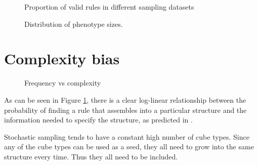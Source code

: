 \begin{figure}[h]
    \centering
    \caption{Proportion of valid rules in different sampling datasets}
\end{figure}


\begin{figure}[h]
    \centering
    \caption{Distribution of phenotype sizes.}
\end{figure}


\section{Complexity bias}

\begin{figure}[h]
    \centering
    \centering
    \centering
    \centering
    \caption{Frequency vs complexity}
    \label{fig:freq_vs_compl}
\end{figure}

As can be seen in Figure \ref{fig:freq_vs_compl}, there is a clear log-linear relationship between the probability of finding a rule that assembles into a particular structure and the information needed to specify the structure, as predicted in \cite{dingle2018input, dingle2020generic}.


Stochastic sampling tends to have a constant high number of cube types. Since any of the cube types can be used as a seed, they all need to grow into the same structure every time. Thus they all need to be included.

